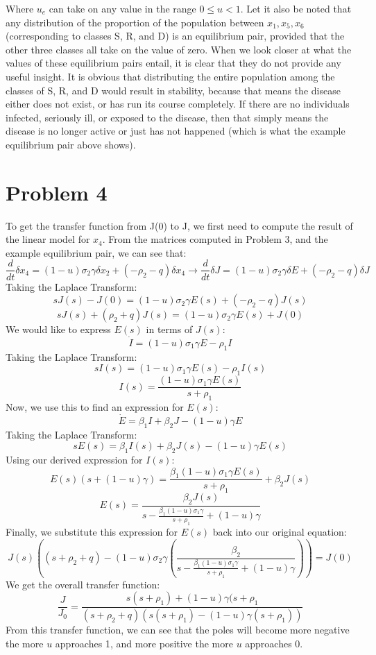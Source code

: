 \documentclass[letterpaper,twocolumn,10pt]{article}
\begin{document}
Where \(u_e\) can take on any value in the range \(0 \leq u < 1\). Let it also be noted that any distribution of the proportion of the population between \(x_{1}, x_{5}, x_{6}\) (corresponding to classes S, R, and D) is an equilibrium pair, provided that the other three classes all take on the value of zero. \hspace*{\fill}
\vspace{3mm}
\linebreak
When we look closer at what the values of these equilibrium pairs entail, it is clear that they do not provide any useful insight. It is obvious that distributing the entire population among the classes of S, R, and D would result in stability, because that means the disease either does not exist, or has run its course completely. If there are no individuals infected, seriously ill, or exposed to the disease, then that simply means the disease is no longer active or just has not happened (which is what the example equilibrium pair above shows).

\section*{Problem 4}
To get the transfer function from J(0) to J, we first need to compute the result of the linear model for \(x_{4}\).
From the matrices computed in Problem 3, and the example equilibrium pair, we can see that:
\[\frac{d}{dt}\delta x_{4} = (1-u)\sigma_{2}\gamma\delta x_{2} + (-\rho_{2} - q)\delta x_{4} \rightarrow \frac{d}{dt}\delta J = (1-u)\sigma_{2}\gamma\delta E + (-\rho_{2} - q)\delta J\]
Taking the Laplace Transform:
\[sJ(s) - J(0) = (1-u)\sigma_{2}\gamma E(s) + (-\rho_{2} - q)J(s)\]
\[sJ(s) + (\rho_{2} + q)J(s) = (1-u)\sigma_{2}\gamma E(s) + J(0)\]
We would like to express \(E(s)\) in terms of \(J(s)\):
\[\dot{I} = (1-u)\sigma_{1}\gamma E - \rho_{1}I\]
Taking the Laplace Transform:
\[sI(s) = (1-u)\sigma_{1}\gamma E(s) - \rho_{1}I(s)\]
\[I(s) = \frac{(1-u)\sigma_{1}\gamma E(s)}{s+\rho_{1}}\]
Now, we use this to find an expression for \(E(s)\):
\[\dot{E} = \beta_{1}I + \beta_{2}J - (1-u)\gamma E\]
Taking the Laplace Transform:
\[sE(s) = \beta_{1}I(s) + \beta_{2}J(s) - (1-u)\gamma E(s)\]
Using our derived expression for \(I(s)\):
\[E(s)(s+(1-u)\gamma) = \frac{\beta_{1}(1-u)\sigma_{1}\gamma E(s)}{s+\rho_{1}} + \beta_{2}J(s)\]
\[E(s) = \frac{\beta_{2}J(s)}{s - \frac{\beta_{1}(1-u)\sigma_{1}\gamma}{s+\rho_{1}}+(1-u)\gamma}\]
Finally, we substitute this expression for \(E(s)\) back into our original equation:
\[J(s)\left((s+\rho_{2}+q)-(1-u)\sigma_{2}\gamma\left(\frac{\beta_{2}}{s - \frac{\beta_{1}(1-u)\sigma_{1}\gamma}{s+\rho_{1}}+(1-u)\gamma}\right)\right) = J(0)\]
We get the overall transfer function:
\[\boxed{\frac{J}{J_{0}}=\frac{s(s+\rho_{1}) + (1-u)\gamma(s+\rho_{1}}{(s+\rho_{2}+q)(s(s+\rho_{1})-(1-u)\gamma(s+\rho_{1}))}}\]
From this transfer function, we can see that the poles will become more negative the more \(u\) approaches 1, and more positive the more \(u\) approaches 0.\hspace*{\fill}
\vspace{2mm}
\linebreak
\end{document}
